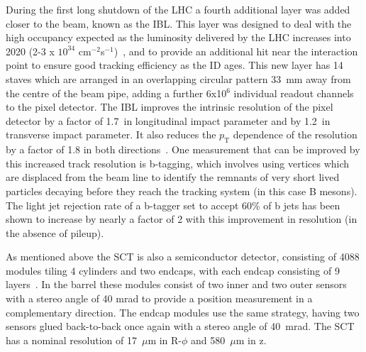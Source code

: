 During the first long shutdown of the LHC a fourth additional layer was added closer to the beam, known as the \gls{IBL}.  
This layer was designed to deal with the high occupancy expected as the luminosity delivered by the LHC increases into 2020 (2-3 x $10^{34}$ cm$^{-2}$s$^{-1}$)~\cite{IBL1}, and to provide an additional hit near the interaction point to ensure good tracking efficiency as the ID ages.  
This new layer has 14 staves which are arranged in an overlapping circular pattern 33~mm away from the centre of the beam pipe, adding a further 6x10$^6$ individual readout channels to the pixel detector.
The IBL improves the intrinsic resolution of the pixel detector by a factor of 1.7~in longitudinal impact parameter and by 1.2~in transverse impact parameter.  
It also reduces the $p_{\mathrm T}$ dependence of the resolution by a factor of 1.8 in both directions~\cite{IBL2}.  
One measurement that can be improved by this increased track resolution is b-tagging, which involves using vertices which are displaced from the beam line to identify the remnants of very short lived particles decaying before they reach the tracking system (in this case B mesons).  
The light jet rejection rate of a b-tagger set to accept 60\% of b jets has been shown to increase by nearly a factor of 2 with this improvement in resolution (in the absence of pileup).

As mentioned above the SCT is also a semiconductor detector, consisting of 4088 modules tiling 4 cylinders and two endcaps, with each endcap consisting of 9 layers~\cite{JOIATLAS}.  
In the barrel these modules consist of two inner and two outer sensors with a stereo angle of 40 mrad to provide a position measurement in a complementary direction.  
The endcap modules use the same strategy, having two sensors glued back-to-back once again with a stereo angle of 40~mrad.  
The SCT has a nominal resolution of 17~$\mu$m in R-$\phi$ and 580~$\mu$m in z.  

